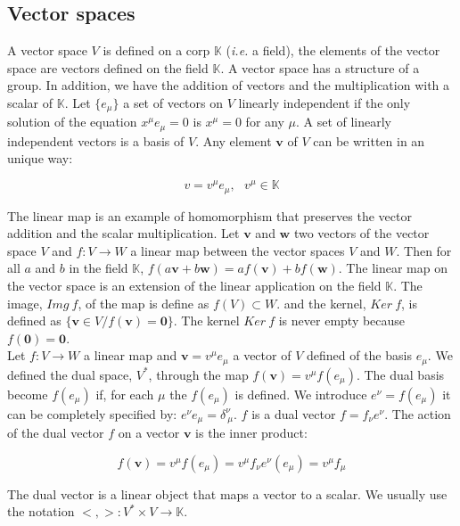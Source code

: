 \documentclass[final, paper=letter,5p,times,twocolumn]{elsarticle}
\theoremstyle{definition}
\begin{document}
\subsection{Vector spaces}

A vector space $V$ is defined on a corp $\mathbb{K}$ ({\it i.e.} a field), the elements of the vector space are vectors defined on the field $\mathbb{K}$. A vector space has a structure of a group. In addition, we have the addition of vectors and the multiplication with a scalar of $\mathbb{K}$. Let $\{e_{\mu}\}$ a set of vectors on $V$ linearly independent if the only solution of the equation $x^{\mu}e_{\mu} = 0$ is $x^{\mu} = 0$ for any $\mu$. A set of linearly independent vectors is a basis of $V$. Any element $\bm{v}$ of $V$ can be written in an unique way:

$$
v = v^{\mu}e_{\mu},~~~v^{\mu} \in \mathbb{K}
$$

The linear map is an example of homomorphism that preserves the vector addition and the scalar multiplication. Let $\bm{v}$ and $\bm{w}$ two vectors of the vector space $V$ and $f : V \rightarrow W$ a linear map between the vector spaces $V$ and $W$. Then for all $a$ and $b$ in the field $\mathbb{K}$, $f(a\bm{v} + b\bm{w}) = af(\bm{v}) + bf(\bm{w})$. The linear map on the vector space is an extension of the linear application on the field $\mathbb{K}$. The image, $Img~f$, of the map is define as $f(V) \subset W$. and the kernel, $Ker~f$, is defined as $\{ \bm{v} \in V / f(\bm{v}) = \bm{0}\}$. The kernel $Ker~f$ is never empty because $f(\bm{0}) = \bm{0}$. \\
Let $f : V \rightarrow W$ a linear map and $\bm{v} = v^{\mu} e_{\mu}$ a vector of $V$ defined of the basis $e_{\mu}$. We defined the dual space, $V^{*}$, through the map $f(\bm{v}) = v^{\mu} f(e_{\mu})$. The dual basis become $f(e_{\mu})$ if, for each $\mu$ the $f(e_{\mu})$ is defined. We introduce $e^{\nu} = f(e_{\mu})$ it can be completely specified by: $e^{\nu}e_{\mu} = \delta_{~\mu}^{\nu}$. $f$ is a dual vector $f = f_{\nu}e^{\nu}$. The action of the dual vector $f$ on a vector $\bm{v}$ is the inner product:

$$
f(\bm{v}) = v^{\mu} f(e_{\mu}) = v^{\mu} f_{\nu}e^{\nu}(e_{\mu}) = v^{\mu} f_{\mu}
$$

The dual vector is a linear object that maps a vector to a scalar. We usually use the notation $<,> : V^{*} \times V \rightarrow \mathbb{K}$. 

\end{document}
